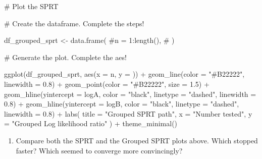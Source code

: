\documentclass[
  letterpaper,
  DIV=11,
  numbers=noendperiod]{scrartcl}
\newenvironment{Shaded}{\begin{snugshade}}{\end{snugshade}}
\newcommand{\AttributeTok}[1]{\textcolor[rgb]{0.40,0.45,0.13}{#1}}
\newcommand{\CommentTok}[1]{\textcolor[rgb]{0.37,0.37,0.37}{#1}}
\newcommand{\FloatTok}[1]{\textcolor[rgb]{0.68,0.00,0.00}{#1}}
\newcommand{\FunctionTok}[1]{\textcolor[rgb]{0.28,0.35,0.67}{#1}}
\newcommand{\NormalTok}[1]{\textcolor[rgb]{0.00,0.23,0.31}{#1}}
\newcommand{\OtherTok}[1]{\textcolor[rgb]{0.00,0.23,0.31}{#1}}
\newcommand{\SpecialCharTok}[1]{\textcolor[rgb]{0.37,0.37,0.37}{#1}}
\newcommand{\StringTok}[1]{\textcolor[rgb]{0.13,0.47,0.30}{#1}}
\providecommand{\tightlist}{%
  \setlength{\itemsep}{0pt}\setlength{\parskip}{0pt}}
\begin{document}
\begin{Shaded}
\begin{Highlighting}[]
\CommentTok{\# Plot the SPRT}

\CommentTok{\# Create the dataframe. Complete the steps!}

\NormalTok{df\_grouped\_sprt }\OtherTok{\textless{}{-}} \FunctionTok{data.frame}\NormalTok{(}
  \CommentTok{\#n = 1:length(),}
  \CommentTok{\#}
\NormalTok{)}

\CommentTok{\# Generate the plot. Complete the aes!}

\FunctionTok{ggplot}\NormalTok{(df\_grouped\_sprt, }\FunctionTok{aes}\NormalTok{(}\AttributeTok{x =}\NormalTok{ n, }\AttributeTok{y =}\NormalTok{ )) }\SpecialCharTok{+}
  \FunctionTok{geom\_line}\NormalTok{(}\AttributeTok{color =} \StringTok{"\#B22222"}\NormalTok{, }\AttributeTok{linewidth =} \FloatTok{0.8}\NormalTok{) }\SpecialCharTok{+}
  \FunctionTok{geom\_point}\NormalTok{(}\AttributeTok{color =} \StringTok{"\#B22222"}\NormalTok{, }\AttributeTok{size =} \FloatTok{1.5}\NormalTok{) }\SpecialCharTok{+}
  \FunctionTok{geom\_hline}\NormalTok{(}\AttributeTok{yintercept =}\NormalTok{ logA, }\AttributeTok{color =} \StringTok{"black"}\NormalTok{, }\AttributeTok{linetype =} \StringTok{"dashed"}\NormalTok{, }\AttributeTok{linewidth =} \FloatTok{0.8}\NormalTok{) }\SpecialCharTok{+}
  \FunctionTok{geom\_hline}\NormalTok{(}\AttributeTok{yintercept =}\NormalTok{ logB, }\AttributeTok{color =} \StringTok{"black"}\NormalTok{, }\AttributeTok{linetype =} \StringTok{"dashed"}\NormalTok{, }\AttributeTok{linewidth =} \FloatTok{0.8}\NormalTok{) }\SpecialCharTok{+}
  \FunctionTok{labs}\NormalTok{(}
    \AttributeTok{title =} \StringTok{"Grouped SPRT path"}\NormalTok{,}
    \AttributeTok{x =} \StringTok{"Number tested"}\NormalTok{,}
    \AttributeTok{y =} \StringTok{"Grouped Log likelihood ratio"}
\NormalTok{  ) }\SpecialCharTok{+}
  \FunctionTok{theme\_minimal}\NormalTok{()}
\end{Highlighting}
\end{Shaded}

\begin{enumerate}
\def\labelenumi{\arabic{enumi}.}
\setcounter{enumi}{13}
\tightlist
\item
  Compare both the SPRT and the Grouped SPRT plots above. Which stopped
  faster? Which seemed to converge more convincingly?
\end{enumerate}

\hfill\break
\hfill\break
\hfill\break
\hfill\break
\hfill\break
\end{document}

